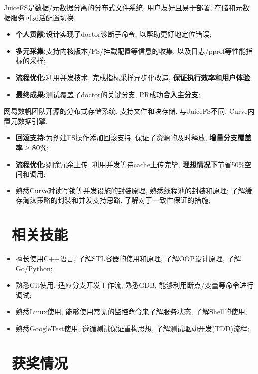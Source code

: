 \documentclass{resume}
\begin{document}
JuiceFS是数据/元数据分离的分布式文件系统, 用户友好且易于部署, 存储和元数据服务可灵活配置切换.
\begin{itemize}[parsep=0.3ex]
  \item \textbf{个人贡献:}设计实现了doctor诊断子命令, 以帮助更好地定位错误;
  \item \textbf{多元采集:}支持内核版本/FS/挂载配置等信息的收集, 以及日志/pprof等性能指标的采样;
  \item \textbf{流程优化:}利用并发技术, 完成指标采样异步化改造, \textbf{保证执行效率和用户体验};
  \item \textbf{最终成果:}测试覆盖了doctor的关键分支, PR成功\textbf{合入主分支};\enspace{}
\end{itemize}
网易数帆团队开源的分布式存储系统, 支持文件和块存储. 与JuiceFS不同, Curve内置元数据引擎.
\begin{itemize}[parsep=0.3ex]
  \item \textbf{回滚支持:}为创建FS操作添加回滚支持, 保证了资源的及时释放, \textbf{增量分支覆盖率$\geq$80\%};\enspace{}
  \item \textbf{流程优化:}剔除冗余上传, 利用并发等待cache上传完毕, \textbf{理想情况下}节省50\%空间和调用;\enspace{}
  \item 熟悉Curve对读写锁等并发设施的封装原理, 熟悉线程池的封装和原理; 了解缓存淘汰策略的封装和并发支持思路, 了解对于一致性保证的措施;
\end{itemize}
\section{\faCogs\ 相关技能}
\begin{itemize}[parsep=0.3ex]
  \item 擅长使用C++语言, 了解STL容器的使用和原理, 了解OOP设计原理, 了解Go/Python;
  \item 熟悉Git使用, 适应分支开发工作流, 熟悉GDB, 能够利用断点/变量等命令进行调试;
  \item 熟悉Linux使用, 能够使用常见的监控命令来了解服务状态, 了解Shell的使用;
  \item 熟悉GoogleTest使用, 遵循测试保证重构思想, 了解测试驱动开发(TDD)流程;
\end{itemize}
\section{\faHeartO\ 获奖情况}
\end{document}
